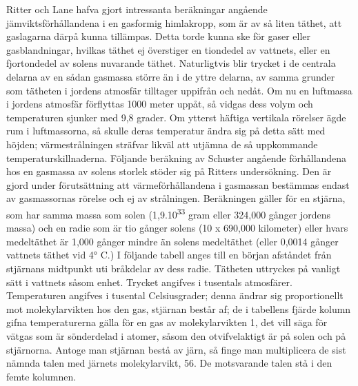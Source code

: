 \documentclass[a4paper, 12pt, oneside, swedish]{article}
\begin{document}
Ritter och Lane hafva gjort intressanta beräkningar angående jämviktsförhållandena i en gasformig himlakropp, som är av så liten täthet, att gaslagarna därpå kunna tillämpas. Detta torde kunna ske för gaser eller gasblandningar, hvilkas täthet ej överstiger en tiondedel av vattnets, eller en fjortondedel av solens nuvarande täthet. Naturligtvis blir trycket i de centrala delarna av en sådan gasmassa större än i de yttre delarna, av samma grunder som tätheten i jordens atmosfär tilltager uppifrån och nedåt. Om nu en luftmassa i jordens atmosfär förflyttas 1000 meter uppåt, så vidgas dess volym och temperaturen sjunker med 9,8 grader. Om ytterst häftiga vertikala rörelser ägde rum i luftmassorna, så skulle deras temperatur ändra sig på detta sätt med höjden; värmestrålningen sträfvar likväl att utjämna de så uppkommande temperaturskillnaderna. Följande beräkning av Schuster angående förhållandena hos en gasmassa av solens storlek stöder sig på Ritters undersökning. Den är gjord under förutsättning att värmeförhållandena i gasmassan bestämmas endast av gasmassornas rörelse och ej av strålningen. Beräkningen gäller för en stjärna, som har samma massa som solen (1,9.10\textsuperscript{33} gram eller 324,000 gånger jordens massa) och en radie som är tio gånger solens (10 x 690,000 kilometer) eller hvars medeltäthet är 1,000 gånger mindre än solens medeltäthet (eller 0,0014 gånger vattnets täthet vid 4° C.) I följande tabell anges till en början afståndet från stjärnans midtpunkt uti bråkdelar av dess radie. Tätheten uttryckes på vanligt sätt i vattnets såsom enhet. Trycket angifves i tusentals atmosfärer. Temperaturen angifves i tusental Celsiusgrader; denna ändrar sig proportionellt mot molekylarvikten hos den gas, stjärnan består af; de i tabellens fjärde kolumn gifna temperaturerna gälla för en gas av molekylarvikten 1, det vill säga för vätgas som är sönderdelad i atomer, såsom den otvifvelaktigt är på solen och på stjärnorna. Antoge man stjärnan bestå av järn, så finge man multiplicera de sist nämnda talen med järnets molekylarvikt, 56. De motsvarande talen stå i den femte kolumnen.
\end{document}
